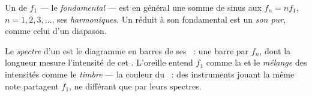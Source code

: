 \begin{definition}[Harmoniques]\label{def:g12:sound-acoustics:harmonics}
Un   de 
$f_1$ --- le \emph{fondamental} --- est en
général une somme de sinus aux  $f_n = n f_1$,
$n = 1, 2, 3, \dots$, ses \emph{harmoniques}. Un
 réduit à son fondamental est un \emph{son pur},
comme celui d'un diapason.
\end{definition}

\begin{definition}\label{def:g12:sound-acoustics:timbre}
Le \emph{spectre} d'un  est le diagramme en
barres de ses ~: une barre par $f_n$, dont la longueur
mesure l'intensité de cet . L'oreille entend $f_1$
comme la  et le \emph{mélange} des intensités comme le
\emph{timbre} --- la couleur du ~: des
instruments jouant la même note partagent $f_1$, ne différant que par
leurs spectres.
\end{definition}

